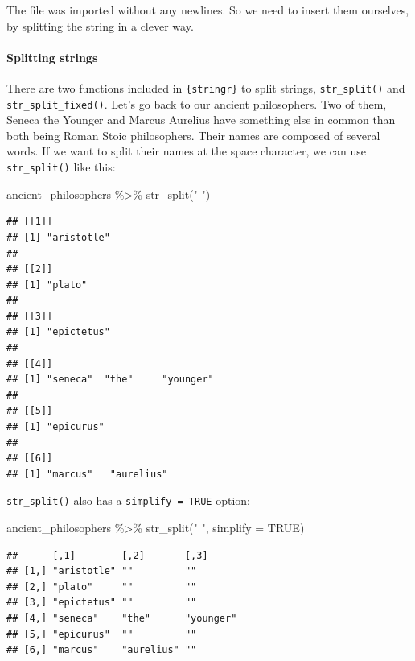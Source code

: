 \documentclass[
]{article}
\newenvironment{Shaded}{\begin{snugshade}}{\end{snugshade}}
\newcommand{\AttributeTok}[1]{\textcolor[rgb]{0.77,0.63,0.00}{#1}}
\newcommand{\ConstantTok}[1]{\textcolor[rgb]{0.00,0.00,0.00}{#1}}
\newcommand{\FunctionTok}[1]{\textcolor[rgb]{0.00,0.00,0.00}{#1}}
\newcommand{\NormalTok}[1]{#1}
\newcommand{\SpecialCharTok}[1]{\textcolor[rgb]{0.00,0.00,0.00}{#1}}
\newcommand{\StringTok}[1]{\textcolor[rgb]{0.31,0.60,0.02}{#1}}
\begin{document}
The file was imported without any newlines. So we need to insert them ourselves, by splitting the
string in a clever way.

\hypertarget{splitting-strings}{%
\paragraph{Splitting strings}\label{splitting-strings}}

There are two functions included in \texttt{\{stringr\}} to split strings, \texttt{str\_split()} and \texttt{str\_split\_fixed()}.
Let's go back to our ancient philosophers. Two of them, Seneca the Younger and Marcus Aurelius have
something else in common than both being Roman Stoic philosophers. Their names are composed of several
words. If we want to split their names at the space character, we can use \texttt{str\_split()} like this:

\begin{Shaded}
\begin{Highlighting}[]
\NormalTok{ancient\_philosophers }\SpecialCharTok{\%\textgreater{}\%}
  \FunctionTok{str\_split}\NormalTok{(}\StringTok{" "}\NormalTok{)}
\end{Highlighting}
\end{Shaded}

\begin{verbatim}
## [[1]]
## [1] "aristotle"
## 
## [[2]]
## [1] "plato"
## 
## [[3]]
## [1] "epictetus"
## 
## [[4]]
## [1] "seneca"  "the"     "younger"
## 
## [[5]]
## [1] "epicurus"
## 
## [[6]]
## [1] "marcus"   "aurelius"
\end{verbatim}

\texttt{str\_split()} also has a \texttt{simplify\ =\ TRUE} option:

\begin{Shaded}
\begin{Highlighting}[]
\NormalTok{ancient\_philosophers }\SpecialCharTok{\%\textgreater{}\%}
  \FunctionTok{str\_split}\NormalTok{(}\StringTok{" "}\NormalTok{, }\AttributeTok{simplify =} \ConstantTok{TRUE}\NormalTok{)}
\end{Highlighting}
\end{Shaded}

\begin{verbatim}
##      [,1]        [,2]       [,3]     
## [1,] "aristotle" ""         ""       
## [2,] "plato"     ""         ""       
## [3,] "epictetus" ""         ""       
## [4,] "seneca"    "the"      "younger"
## [5,] "epicurus"  ""         ""       
## [6,] "marcus"    "aurelius" ""
\end{verbatim}
\end{document}
